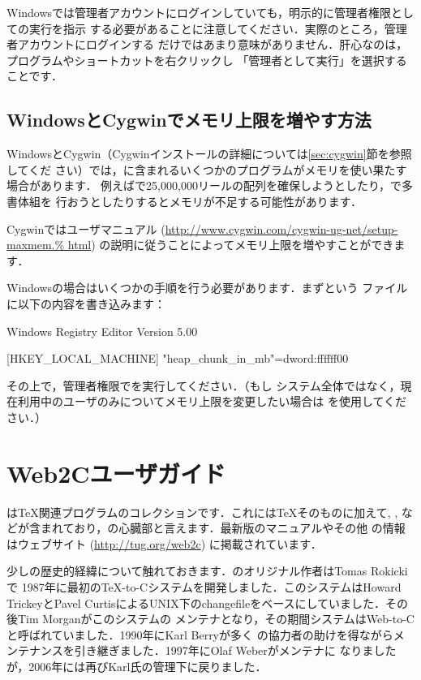 \documentclass[uplatex,dvipdfmx]{jsarticle}
\begin{document}
Windowsでは管理者アカウントにログインしていても，明示的に管理者権限としての実行を指示
する必要があることに注意してください．実際のところ，管理者アカウントにログインする
だけではあまり意味がありません．肝心なのは，プログラムやショートカットを右クリックし
「管理者として実行」を選択することです．

\subsection{WindowsとCygwinでメモリ上限を増やす方法}
\label{sec:cygwin-maxmem}

WindowsとCygwin（Cygwinインストールの詳細については\ref{sec:cygwin}節を参照してくだ
さい）では，\TL に含まれるいくつかのプログラムがメモリを使い果たす場合があります．
例えばで25,000,000リールの配列を確保しようとしたり，\LuaTeX で多書体組を
行おうとしたりするとメモリが不足する可能性があります．

Cygwinではユーザマニュアル (\url{http://www.cygwin.com/cygwin-ug-net/setup-maxmem.%
html}) の説明に従うことによってメモリ上限を増やすことができます．

Windowsの場合はいくつかの手順を行う必要があります．まずという
ファイルに以下の内容を書き込みます：
%
\begin{sverbatim}
Windows Registry Editor Version 5.00

[HKEY_LOCAL_MACHINE\Software\Cygwin]
"heap_chunk_in_mb"=dword:ffffff00
\end{sverbatim}
%
その上で，管理者権限でを実行してください．（もし
システム全体ではなく，現在利用中のユーザのみについてメモリ上限を変更したい場合は
を使用してください．）

\section{Web2Cユーザガイド}

\Webc は\TeX 関連プログラムのコレクションです．これには\TeX そのものに加えて\MF,
\MP, \BibTeX などが含まれており，\TL の心臓部と言えます．最新版のマニュアルやその他
の情報はウェブサイト (\url{http://tug.org/web2c}) に掲載されています．

少し\Webc の歴史的経緯について触れておきます．\Webc のオリジナル作者はTomas Rokickiで
1987年に最初の\TeX -to-Cシステムを開発しました．このシステムはHoward TrickeyとPavel
CurtisによるUNIX下のchangefileをベースにしていました．その後Tim Morganがこのシステムの
メンテナとなり，その期間システムはWeb-to-Cと呼ばれていました．1990年にKarl Berryが多く
の協力者の助けを得ながらメンテナンスを引き継ぎました．1997年にOlaf Weberがメンテナに
なりましたが，2006年には再びKarl氏の管理下に戻りました．
\end{document}
